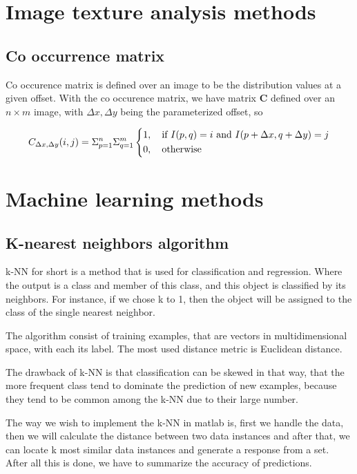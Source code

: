 \section{Image texture analysis methods}

\subsection{Co occurrence matrix}

Co occurence matrix is defined over an image to be the distribution values at a given offset.\cite{Bharati} With the co occurence matrix, we have matrix \textbf{C} defined over an $n \times m$ image, with $\Delta x, \Delta y$ being the parameterized offset, so

\[
C_{\Delta x, \Delta y}(i, j) = \Sigma_{p=1}^n\Sigma_{q=1}^m 
\begin{dcases}
  1, \quad \text{if } I(p,q)=i \text{ and } I(p+\Delta x, q+ \Delta y) =j \\
  0, \quad \text{otherwise}
\end{dcases}
\]

\section{Machine learning methods}

\subsection{K-nearest neighbors algorithm}

k-NN for short is a method that is used for classification and regression. Where the output is a class and member of this class, and this object is classified by its neighbors. For instance, if we chose k to 1, then the object will be assigned to the class of the single nearest neighbor.

The algorithm consist of training examples, that are vectors in multidimensional space, with each its label. The most used distance metric is Euclidean distance.

The drawback of k-NN is that classification can be skewed in that way, that the more frequent class tend to dominate the prediction of new examples, because they tend to be common among the k-NN due to their large number.

The way we wish to implement the k-NN in matlab is, first we handle the data, then we will calculate the distance between two data instances and after that, we can locate k most similar data instances and generate a response from a set. After all this is done, we have to summarize the accuracy of predictions.




